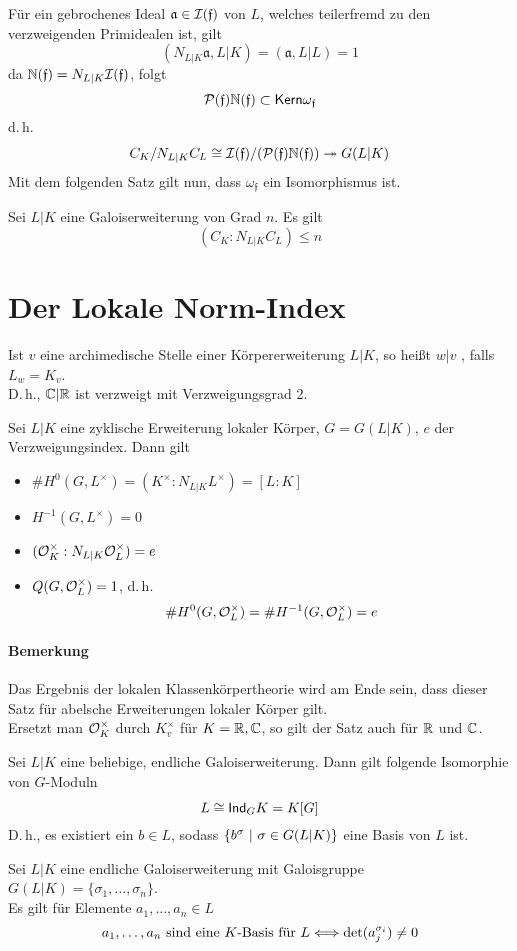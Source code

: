 \documentclass{book}
\renewcommand{\i}{^{-1}}
\newcommand{\af}{\mathfrak{a}}
\newcommand{\ff}{\mathfrak{f}}
\begin{document}
\Bem{}
Für ein gebrochenes Ideal $\af \in \I(\ff)$ von $L$, welches teilerfremd zu den verzweigenden Primidealen ist, gilt
\[ (N_{L|K}\af, L|K) = (\af, L|L) = 1 \]
da $\N(\ff) = N_{L|K} \I(\ff)$, folgt
\[ \P(\ff) \N(\ff) \subset \Ker \omega_\ff  \]
d.\,h.
\[ C_K/N_{L|K}C_L \isom{} \I(\ff) / (\P(\ff) \N(\ff)) \surj{} G(L|K) \]
Mit dem folgenden Satz gilt nun, dass $\omega_\ff$ ein Isomorphismus ist.

Sei $L|K$ eine Galoiserweiterung von Grad $n$. Es gilt
\[ (C_K : N_{L|K}C_L ) \leq n \]

\section{Der Lokale Norm-Index}

Ist $v$ eine archimedische Stelle einer Körpererweiterung $L|K$, so heißt $w|v$ , falls $L_w = K_v$.\\
D.\,h., $\mathbb{C}|\mathbb{R}$ ist verzweigt mit Verzweigungsgrad 2.

\Satz{}
Sei $L|K$ eine zyklische Erweiterung lokaler Körper, $G = G(L|K)$, $e$ der Verzweigungsindex. Dann gilt
\begin{itemize}
\item $\# H^0(G,L^\times) = (K^\times : N_{L|K}L^\times) = [L:K]$
\item $H\i(G,L^\times) = 0$
\item $(\mathcal{O}_K^\times : N_{L|K}\mathcal{O}_L^\times) = e$
\item $Q(G, \mathcal{O}_L^\times) = 1$, d.\,h. 
\[ \#H^0(G, \O_L^\times) = \#H\i(G, \O_L^\times) = e \]
\end{itemize}
\paragraph{Bemerkung}
Das Ergebnis der lokalen Klassenkörpertheorie wird am Ende sein, dass dieser Satz für abelsche Erweiterungen lokaler Körper gilt.\\
Ersetzt man $\mathcal{O}_K^\times$ durch $K_v^\times$ für $K = \mathbb{R},\mathbb{C}$, so gilt der Satz auch für $\mathbb{R}$ und $\mathbb{C}$.

Sei $L|K$ eine beliebige, endliche Galoiserweiterung. Dann gilt folgende Isomorphie von $G$-Moduln
\[ L \overset{}{\cong} \textsf{Ind}_GK = K[G] \]
D.\,h., es existiert ein $b \in L$, sodass $\set{b^\sigma}{\sigma \in G(L|K)}$ eine Basis von $L$ ist.

\Lem{}
Sei $L|K$ eine endliche Galoiserweiterung mit Galoisgruppe $G(L|K) = \{\sigma_1, \ldots, \sigma_n\}$.\\
Es gilt für Elemente $a_1,\ldots, a_n \in L$
\[ a_1,\ldots, a_n \text{ sind eine }K\text{-Basis für }L \overset{}{\Longleftrightarrow} \det(a_j^{\sigma_i}) \neq 0 \]
\end{document}
